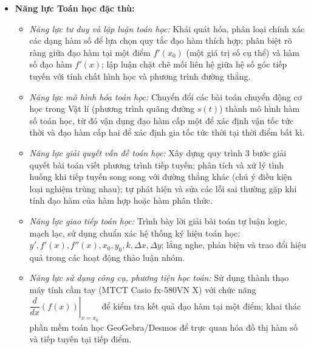 \documentclass[12pt, a4paper]{article}
\begin{document}
\begin{itemize}[leftmargin=1.2cm]
    \item \textbf{Năng lực Toán học đặc thù:}
    \begin{itemize}[leftmargin=0.6cm]
        \item \textit{Năng lực tư duy và lập luận toán học:} Khái quát hóa, phân loại chính xác các dạng hàm số để lựa chọn quy tắc đạo hàm thích hợp; phân biệt rõ ràng giữa đạo hàm tại một điểm $f'(x_0)$ (một giá trị số cụ thể) và hàm số đạo hàm $f'(x)$; lập luận chặt chẽ mối liên hệ giữa hệ số góc tiếp tuyến với tính chất hình học và phương trình đường thẳng.
        \item \textit{Năng lực mô hình hóa toán học:} Chuyển đổi các bài toán chuyển động cơ học trong Vật lí (phương trình quãng đường $s(t)$) thành mô hình hàm số toán học, từ đó vận dụng đạo hàm cấp một để xác định vận tốc tức thời và đạo hàm cấp hai để xác định gia tốc tức thời tại thời điểm bất kì.
        \item \textit{Năng lực giải quyết vấn đề toán học:} Xây dựng quy trình 3 bước giải quyết bài toán viết phương trình tiếp tuyến; phân tích và xử lý tình huống khi tiếp tuyến song song với đường thẳng khác (chú ý điều kiện loại nghiệm trùng nhau); tự phát hiện và sửa các lỗi sai thường gặp khi tính đạo hàm của hàm hợp hoặc hàm phân thức.
        \item \textit{Năng lực giao tiếp toán học:} Trình bày lời giải bài toán tự luận logic, mạch lạc, sử dụng chuẩn xác hệ thống ký hiệu toán học: $y', f'(x), f''(x), x_0, y_0, k, \Delta x, \Delta y$; lắng nghe, phản biện và trao đổi hiệu quả trong các hoạt động thảo luận nhóm.
        \item \textit{Năng lực sử dụng công cụ, phương tiện học toán:} Sử dụng thành thạo máy tính cầm tay (MTCT Casio fx-580VN X) với chức năng $\left.\dfrac{d}{dx}\left(f(x)\right)\right|_{x=x_0}$ để kiểm tra kết quả đạo hàm tại một điểm; khai thác phần mềm toán học GeoGebra/Desmos để trực quan hóa đồ thị hàm số và tiếp tuyến tại tiếp điểm.
    \end{itemize}


\end{itemize}
\end{document}
